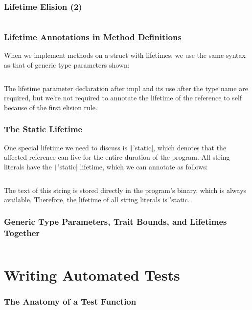 \documentclass{beamer}
\begin{document}
\begin{frame}[fragile]
	\frametitle{Lifetime Elision (2)}
	
	\inputminted[fontsize=\scriptsize]{rust}{./code/lifetime7.rs}
\end{frame}


\begin{frame}[fragile]
	\frametitle{Lifetime Annotations in Method Definitions}
	When we implement methods on a struct with lifetimes, we use the same syntax as that of generic type parameters shown: 
	
	\inputminted{rust}{./code/lifetime8.rs}
	
	The lifetime parameter declaration after impl and its use after the type name are required, but we’re not required to annotate the lifetime of the reference to self because of the first elision rule.
\end{frame}

\begin{frame}[fragile]
	\frametitle{The Static Lifetime}
	One special lifetime we need to discuss is \texttt|'static|, which denotes that the affected reference can live for the entire duration of the program. All string literals have the \texttt|'static| lifetime, which we can annotate as follows:
	
	\inputminted{rust}{./code/lifetime9.rs}
	
	The text of this string is stored directly in the program’s binary, which is always available. Therefore, the lifetime of all string literals is 'static.
\end{frame}


\begin{frame}[fragile]
	\frametitle{Generic Type Parameters, Trait Bounds, and Lifetimes Together}

	\inputminted{rust}{./code/lifetime10.rs}
\end{frame}

\section{Writing Automated Tests}

\begin{frame}[fragile]
	\frametitle{The Anatomy of a Test Function}
	
	\inputminted{rust}{./code/test1.rs}
	
	\inputminted[fontsize=\scriptsize]{shell}{./code/test1.shell}
\end{frame}
\end{document}
